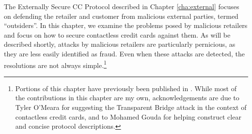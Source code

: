 The Externally Secure CC Protocol described in Chapter \ref{cha:external} focuses on defending the retailer and customer from malicious external parties, termed ``outsiders''.
In this chapter, we examine the problems posed by malicious retailers and focus on how to secure contactless credit cards against them.
As will be described shortly, attacks by malicious retailers are particularly pernicious, as they are less easily identified as fraud.
Even when these attacks are detected, the resolutions are not always simple.\footnote{
        Portions of this chapter have previously been published in \cite{jensen2}.
        While most of the contributions in this chapter are my own,
        acknowledgements are due to Tyler O'Meara for suggesting the Transparent Bridge attack in the context of contactless credit cards,
        and to Mohamed Gouda for helping construct clear and concise protocol descriptions.
}
